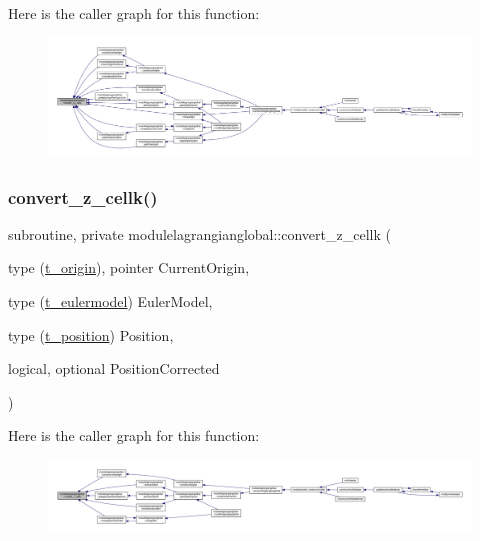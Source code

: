 Here is the caller graph for this function\+:\nopagebreak
\begin{figure}[H]
\begin{center}
\leavevmode
\includegraphics[width=350pt]{namespacemodulelagrangianglobal_a713100b692a8ced1a6b27a0a1baa4039_icgraph}
\end{center}
\end{figure}
\mbox{\label{namespacemodulelagrangianglobal_a619a331b54dcc8d330ab6dd05b4eae56}} 
\subsubsection{\texorpdfstring{convert\+\_\+z\+\_\+cellk()}{convert\_z\_cellk()}}
{\footnotesize\ttfamily subroutine, private modulelagrangianglobal\+::convert\+\_\+z\+\_\+cellk (\begin{DoxyParamCaption}\item[{type (\mbox{\hyperlink{structmodulelagrangianglobal_1_1t__origin}{t\+\_\+origin}}), pointer}]{Current\+Origin,  }\item[{type (\mbox{\hyperlink{structmodulelagrangianglobal_1_1t__eulermodel}{t\+\_\+eulermodel}})}]{Euler\+Model,  }\item[{type (\mbox{\hyperlink{structmodulelagrangianglobal_1_1t__position}{t\+\_\+position}})}]{Position,  }\item[{logical, optional}]{Position\+Corrected }\end{DoxyParamCaption})\hspace{0.3cm}{\ttfamily [private]}}

Here is the caller graph for this function\+:\nopagebreak
\begin{figure}[H]
\begin{center}
\leavevmode
\includegraphics[width=350pt]{namespacemodulelagrangianglobal_a619a331b54dcc8d330ab6dd05b4eae56_icgraph}
\end{center}
\end{figure}
\mbox{\label{namespacemodulelagrangianglobal_ac2d819c6cb2d9890063752019007589c}} 
